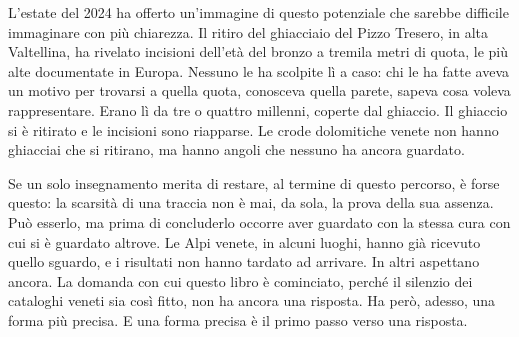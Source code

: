 L'estate del 2024 ha offerto un'immagine di questo potenziale che sarebbe difficile immaginare con più chiarezza. Il ritiro del ghiacciaio del Pizzo Tresero, in alta Valtellina, ha rivelato incisioni dell'età del bronzo a tremila metri di quota, le più alte documentate in Europa. Nessuno le ha scolpite lì a caso: chi le ha fatte aveva un motivo per trovarsi a quella quota, conosceva quella parete, sapeva cosa voleva rappresentare. Erano lì da tre o quattro millenni, coperte dal ghiaccio. Il ghiaccio si è ritirato e le incisioni sono riapparse. Le crode dolomitiche venete non hanno ghiacciai che si ritirano, ma hanno angoli che nessuno ha ancora guardato.

Se un solo insegnamento merita di restare, al termine di questo percorso, è forse questo: la scarsità di una traccia non è mai, da sola, la prova della sua assenza. Può esserlo, ma prima di concluderlo occorre aver guardato con la stessa cura con cui si è guardato altrove. Le Alpi venete, in alcuni luoghi, hanno già ricevuto quello sguardo, e i risultati non hanno tardato ad arrivare. In altri aspettano ancora. La domanda con cui questo libro è cominciato, perché il silenzio dei cataloghi veneti sia così fitto, non ha ancora una risposta. Ha però, adesso, una forma più precisa. E una forma precisa è il primo passo verso una risposta.
